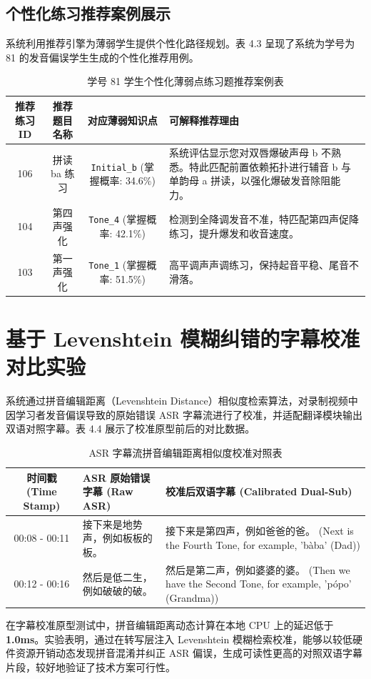 \subsection{个性化练习推荐案例展示}
系统利用推荐引擎为薄弱学生提供个性化路径规划。表 4.3 呈现了系统为学号为 81 的发音偏误学生生成的个性化推荐用例。

\begin{table}[htbp]
\centering
\caption{学号 81 学生个性化薄弱点练习题推荐案例表}
\label{tab:recommend_case}
\begin{tabularx}{\textwidth}{c|c|c|X}
\hline
\textbf{推荐练习 ID} & \textbf{推荐题目名称} & \textbf{对应薄弱知识点} & \textbf{可解释推荐理由} \\ \hline
106 & 拼读 ba 练习 & \texttt{Initial\_b} (掌握概率: 34.6\%) & 系统评估显示您对双唇爆破声母 b 不熟悉。特此匹配前置依赖拓扑进行辅音 b 与单韵母 a 拼读，以强化爆破发音除阻能力。 \\ \hline
104 & 第四声强化 & \texttt{Tone\_4} (掌握概率: 42.1\%) & 检测到全降调发音不准，特匹配第四声促降练习，提升爆发和收音速度。 \\ \hline
103 & 第一声强化 & \texttt{Tone\_1} (掌握概率: 51.5\%) & 高平调声声调练习，保持起音平稳、尾音不滑落。 \\ \hline
\end{tabularx}
\end{table}

\section{基于 Levenshtein 模糊纠错的字幕校准对比实验}

系统通过拼音编辑距离（Levenshtein Distance）相似度检索算法，对录制视频中因学习者发音偏误导致的原始错误 ASR 字幕流进行了校准，并适配翻译模块输出双语对照字幕。表 4.4 展示了校准原型前后的对比数据。

\begin{table}[htbp]
\centering
\caption{ASR 字幕流拼音编辑距离相似度校准对照表}
\label{tab:asr_comparison}
\begin{tabularx}{\textwidth}{c|X|X}
\hline
\textbf{时间戳 (Time Stamp)} & \textbf{ASR 原始错误字幕 (Raw ASR)} & \textbf{校准后双语字幕 (Calibrated Dual-Sub)} \\ \hline
00:08 - 00:11 & 接下来是地势声，例如板板的板。 & 接下来是第四声，例如爸爸的爸。 \newline (Next is the Fourth Tone, for example, 'bàba' (Dad)) \\ \hline
00:12 - 00:16 & 然后是低二生，例如破破的破。 & 然后是第二声，例如婆婆的婆。 \newline (Then we have the Second Tone, for example, 'pópo' (Grandma)) \\ \hline
\end{tabularx}
\end{table}

在字幕校准原型测试中，拼音编辑距离动态计算在本地 CPU 上的延迟低于 \textbf{1.0ms}。实验表明，通过在转写层注入 Levenshtein 模糊检索校准，能够以较低硬件资源开销动态发现拼音混淆并纠正 ASR 偏误，生成可读性更高的对照双语字幕片段，较好地验证了技术方案可行性。
